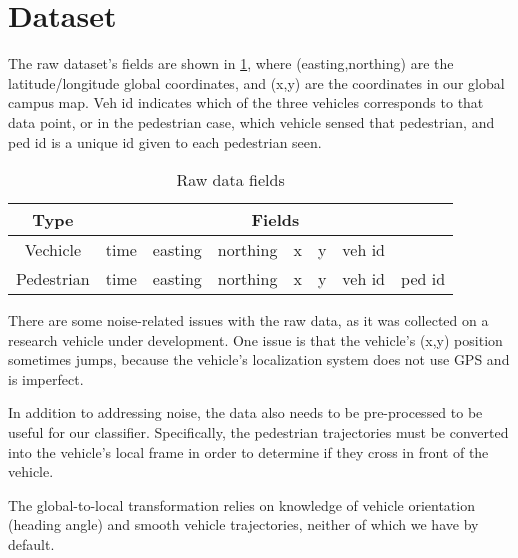 
\section{Dataset} \label{sec:dataset}


The raw dataset's fields are shown in \cref{table_data}, where (easting,northing) are the latitude/longitude global coordinates, and (x,y) are the coordinates in our global campus map.
Veh id indicates which of the three vehicles corresponds to that data point, or in the pedestrian case, which vehicle sensed that pedestrian, and ped id is a unique id given to each pedestrian seen.

\begin{table}[ht!]
\centering
\begin{tabular}{||c||c c c c c c c||}  
 \hline
 \multirow{1}{*}{Type} &
       \multicolumn{7}{c||}{Fields} \\
 \hline\hline
 Vechicle & time & easting & northing & x & y & veh id & \\ \hline
 Pedestrian & time & easting & northing & x & y & veh id & ped id \\ \hline
\end{tabular}
\caption{Raw data fields}
\label{table_data}
\end{table}

There are some noise-related issues with the raw data, as it was collected on a research vehicle under development.
One issue is that the vehicle's (x,y) position sometimes jumps, because the vehicle's localization system does not use GPS and is imperfect.

In addition to addressing noise, the data also needs to be pre-processed to be useful for our classifier.
Specifically, the pedestrian trajectories must be converted into the vehicle's local frame in order to determine if they cross in front of the vehicle.

The global-to-local transformation relies on knowledge of vehicle orientation (heading angle) and smooth vehicle trajectories, neither of which we have by default.

